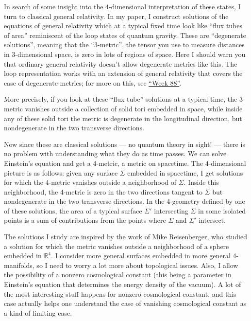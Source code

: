 \documentclass{article}
\begin{document}
In search of some insight into the \(4\)-dimensional interpretation of
these states, I turn to classical general relativity. In my paper, I
construct solutions of the equations of general relativity which at a
typical fixed time look like ``flux tubes of area'' reminiscent of the
loop states of quantum gravity. These are ``degenerate solutions'',
meaning that the ``3-metric'', the tensor you use to measure distances
in 3-dimensional space, is zero in lots of regions of space. Here I
should warn you that ordinary general relativity doesn't allow
degenerate metrics like this. The loop representation works with an
extension of general relativity that covers the case of degenerate
metrics; for more on this, see \protect\hyperlink{week88}{``Week 88''}.

More precisely, if you look at these ``flux tube'' solutions at a
typical time, the 3-metric vanishes outside a collection of solid tori
embedded in space, while inside any of these solid tori the metric is
degenerate in the longitudinal direction, but nondegenerate in the two
transverse directions.

Now since these are classical solutions --- no quantum theory in sight!
--- there is no problem with understanding what they do as time passes.
We can solve Einstein's equation and get a 4-metric, a metric on
spacetime. The \(4\)-dimensional picture is as follows: given any
surface \(\Sigma\) embedded in spacetime, I get solutions for which the
4-metric vanishes outside a neighborhood of \(\Sigma\). Inside this
neighborhood, the 4-metric is zero in the two directions tangent to
\(\Sigma\) but nondegenerate in the two transverse directions. In the
4-geometry defined by one of these solutions, the area of a typical
surface \(\Sigma'\) intersecting \(\Sigma\) in some isolated points is a
sum of contributions from the points where \(\Sigma\) and \(\Sigma'\)
intersect.

The solutions I study are inspired by the work of Mike Reisenberger, who
studied a solution for which the metric vanishes outside a neighborhood
of a sphere embedded in \(\mathbb{R}^4\). I consider more general
surfaces embedded in more general 4-manifolds, so I need to worry a lot
more about topological issues. Also, I allow the possibility of a
nonzero cosmological constant (this being a parameter in Einstein's
equation that determines the energy density of the vacuum). A lot of the
most interesting stuff happens for nonzero cosmological constant, and
this case actually helps one understand the case of vanishing
cosmological constant as a kind of limiting case.
\end{document}

